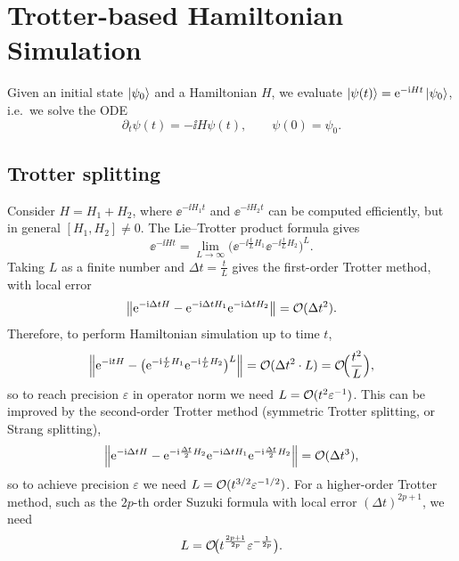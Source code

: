 \chapter{Trotter-based Hamiltonian Simulation}\label{ch:sec04}

Given an initial state $\ket{\psi_0}$ and a Hamiltonian $H$, we evaluate
$\ket{\psi(t)} = \mathrm{e}^{-\mathrm{i} H t}\ket{\psi_0}$, i.e.\ we solve the ODE
\begin{equation}
  \partial_t \psi(t) = -\ii H\psi(t), \qquad \psi(0) = \psi_0.
\end{equation}

\section{Trotter splitting}\label{sec:sec04-trotter}

Consider $H = H_1 + H_2$, where $\ee^{-\ii H_1 t}$ and $\ee^{-\ii H_2 t}$ can be
computed efficiently, but in general $[H_1, H_2] \neq 0$. The Lie--Trotter
product formula gives
\begin{equation}
  \ee^{-\ii H t} = \lim_{L \to \infty}\bigl(\ee^{-\ii \frac{t}{L} H_1}\ee^{-\ii \frac{t}{L} H_2}\bigr)^L.
\end{equation}
Taking $L$ as a finite number and $\Delta t = \tfrac{t}{L}$ gives the first-order
Trotter method, with local error
\begin{equation}
  \left\lVert \mathrm{e}^{-\mathrm{i} \Delta t H} - \mathrm{e}^{-\mathrm{i} \Delta t H_1}\mathrm{e}^{-\mathrm{i} \Delta t H_2} \right\rVert = \mathcal{O}(\Delta t^2).
\end{equation}
Therefore, to perform Hamiltonian simulation up to time $t$,
\begin{equation}
  \left\lVert \mathrm{e}^{-\mathrm{i} t H} - \bigl(\mathrm{e}^{-\mathrm{i} \frac{t}{L} H_1}\mathrm{e}^{-\mathrm{i} \frac{t}{L} H_2}\bigr)^L \right\rVert
  = \mathcal{O}(\Delta t^2 \cdot L) = \mathcal{O}\!\Bigl(\frac{t^2}{L}\Bigr),
\end{equation}
so to reach precision $\varepsilon$ in operator norm we need
$L = \mathcal{O}(t^2 \varepsilon^{-1})$. This can be improved by the second-order
Trotter method (symmetric Trotter splitting, or Strang splitting),
\begin{equation}
  \left\lVert \mathrm{e}^{-\mathrm{i} \Delta t H} - \mathrm{e}^{-\mathrm{i} \frac{\Delta t}{2} H_2}\mathrm{e}^{-\mathrm{i} \Delta t H_1}\mathrm{e}^{-\mathrm{i} \frac{\Delta t}{2} H_2} \right\rVert = \mathcal{O}(\Delta t^3),
\end{equation}
so to achieve precision $\varepsilon$ we need
$L = \mathcal{O}(t^{3/2}\varepsilon^{-1/2})$. For a higher-order Trotter method, such as
the $2p$-th order Suzuki formula with local error $(\Delta t)^{2p+1}$, we need
\begin{equation}
  L = \mathcal{O}\!\bigl(t^{\frac{2p+1}{2p}}\varepsilon^{-\frac{1}{2p}}\bigr).
\end{equation}

